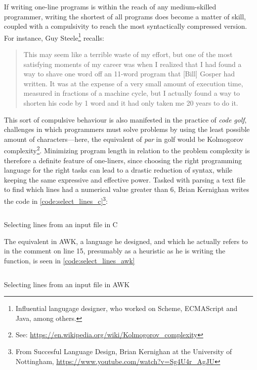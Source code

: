 If writing one-line programs is within the reach of any medium-skilled programmer, writing the shortest of all programs does become a matter of skill, coupled with a compulsivity to reach the most syntactically compressed version. For instance, Guy Steele\footnote{Influential langugage designer, who worked on Scheme, ECMAScript and Java, among others.} recalls:

\begin{quote}
  This may seem like a terrible waste of my effort, but one of the most satisfying moments of my career was when I realized that I had found a way to shave one word off an 11-word program that [Bill] Gosper had written. It was at the expense of a very small amount of execution time, measured in fractions of a machine cycle, but I actually found a way to shorten his code by 1 word and it had only taken me 20 years to do it. \citep{seibel_coders_2009}
\end{quote}

This sort of compulsive behaviour is also manifested in the practice of \emph{code golf}, challenges in which programmers must solve problems by using the least possible amount of characters—here, the equivalent of \emph{par} in golf would be Kolmogorov complexity\footnote{See: \url{https://en.wikipedia.org/wiki/Kolmogorov_complexity}}. Minimizing program length in relation to the problem complexity is therefore a definite feature of one-liners, since choosing the right programming language for the right tasks can lead to a drastic reduction of syntax, while keeping the same expressive and effective power. Tasked with parsing a text file to find which lines had a numerical value greater than 6, Brian Kernighan writes the code in \ref{code:select_lines_c}\footnote{From Succesful Language Design, Brian Kernighan at the University of Nottingham, \url{https://www.youtube.com/watch?v=Sg4U4r_AgJU}}:

\pagebreak
\begin{listing}
  \inputminted{cpp}{./corpus/select_lines.c}
  \caption{Selecting lines from an input file in C}
  \label{code:select_lines_c}
\end{listing}

The equivalent in AWK, a language he designed, and which he actually refers to in the comment on line 15, presumably as a heuristic as he is writing the function, is seen in \ref{code:select_lines_awk}

\begin{listing}
  \inputminted{bash}{./corpus/select_lines.sh}
  \caption{Selecting lines from an input file in AWK}
  \label{code:select_lines_awk}
\end{listing}

